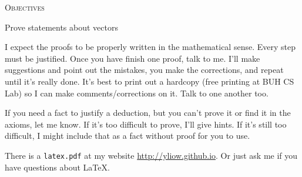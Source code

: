 


\renewcommand\TITLE{Assignment 5}

\renewcommand\EMAIL{}
\newcommand\defonet[1]{\textbf{#1}}


\makeatletter
{}
\newenvironment{myenumt}[1][]
  {\begin{myenumt@}[#1]
     }
  {\end{myenumt@}}
\makeatother




\topmatter

\textsc{Objectives}
\begin{myenumt}
\li Prove statements about vectors
\end{myenumt}

I expect the proofs to be properly written in the mathematical sense.
Every step must be justified.
Once you have finish one proof, talk to me.
I'll make suggestions and point out the mistakes,
you make the corrections, and repeat until it's really done.
It's best to print out a hardcopy (free printing at BUH CS Lab)
so I can make comments/corrections on it.
Talk to one another too.

If you need a fact to justify a deduction, but you can't prove it
or find it in the axioms, let me know.
If it's too difficult to prove, I'll give hints.
If it's still too difficult, I might include that as a fact without proof
for you to use.

There is a \verb!latex.pdf! at my website \url{http://yliow.github.io}.
Or just ask me if you have questions about \LaTeX.
